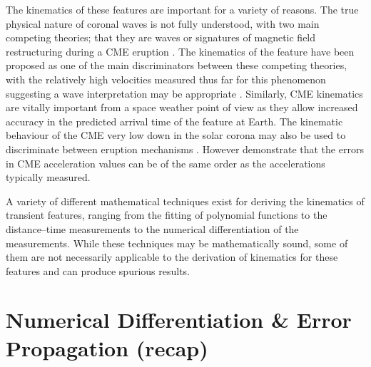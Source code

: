 \documentclass[structabstract]{aa}
\begin{document}
The kinematics of these features are important for a variety of reasons. The true physical nature of coronal waves is not fully understood, with two main competing theories; that they are waves \citep[e.g.,][]{2012ApJ...754....7S,2010ApJ...716L..57V} or signatures of magnetic field restructuring during a CME eruption \citep[e.g.,][]{2011ApJ...738..167S,2011ApJ...732L..20C}. The kinematics of the feature have been proposed as one of the main discriminators between these competing theories, with the relatively high velocities measured thus far for this phenomenon suggesting a wave interpretation may be appropriate \citep[cf.][]{2011A&A...532A.151W,2012ApJ...753..112Z}. Similarly, CME kinematics are vitally important from a space weather point of view as they allow increased accuracy in the predicted arrival time of the feature at Earth. The kinematic behaviour of the CME very low down in the solar corona may also be used to discriminate between eruption mechanisms \citep[cf.][]{2010A&A...516A..44L}. However \citet{2007ApJ...657.1117W} demonstrate that the errors in CME acceleration values can be of the same order as the accelerations typically measured. 

A variety of different mathematical techniques exist for deriving the kinematics of transient features, ranging from the fitting of polynomial functions to the distance--time measurements to the numerical differentiation of the measurements. While these techniques may be mathematically sound, some of them are not necessarily applicable to the derivation of kinematics for these features and can produce spurious results. 


\section{Numerical Differentiation \& Error Propagation (recap)}
\label{sect:num_diff_errors}
\end{document}
